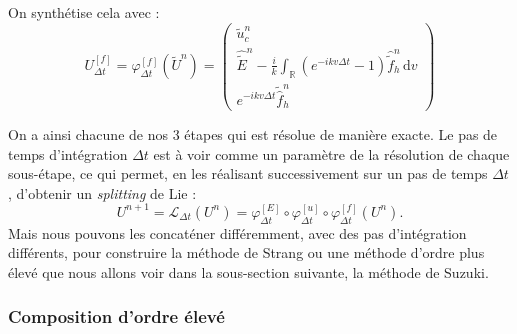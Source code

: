 On synthétise cela avec :
$$
  U^{[f]}_{\Delta t} = \varphi^{[f]}_{\Delta t}(\tilde{U}^n)
  = \begin{pmatrix}
          \tilde{u}_c^n \\
\hat{\tilde{E}}^n - \frac{i}{k}\int_\mathbb{R} \left(e^{-ikv\Delta t}-1\right)\hat{\tilde{f}}_h^n\,\mathrm{d}v\\ 
          e^{-ikv\Delta t}\tilde{\hat{f}}_h^n
        \end{pmatrix}
$$

On a ainsi chacune de nos 3 étapes qui est résolue de manière exacte. Le pas de temps d'intégration $\Delta t$ est à voir comme un paramètre de la résolution de chaque sous-étape, ce qui permet, en les réalisant successivement sur un pas de temps $\Delta t$, d'obtenir un \emph{splitting} de Lie :
\begin{equation}
  U^{n+1} = \mathcal{L}_{\Delta t}(U^n) = \varphi^{[E]}_{\Delta t} \circ \varphi^{[u]}_{\Delta t} \circ \varphi^{[f]}_{\Delta t}(U^n).
  \label{eq:lie}
\end{equation}
Mais nous pouvons les concaténer différemment, avec des pas d'intégration différents, pour construire la méthode de Strang ou une méthode d'ordre plus élevé que nous allons voir dans la sous-section suivante, la méthode de Suzuki.

\subsubsection{Composition d'ordre élevé}
\label{ssec:2:suzuki}

